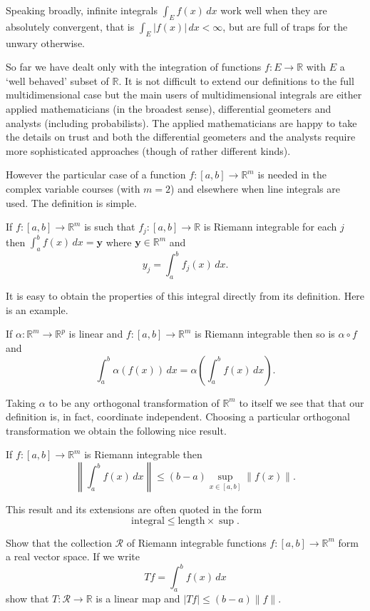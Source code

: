 Speaking broadly, infinite integrals $\int_{E}f(x)\,dx$
work well when they are absolutely convergent, that is
$\int_{E}|f(x)|\,dx<\infty$, but are full of traps for
the unwary otherwise.

So far we have dealt only with the integration
of functions $f:E\rightarrow{\mathbb R}$ with
$E$ a `well behaved' subset of ${\mathbb R}$.
It is not difficult to extend our definitions to
the full multidimensional case but the main users
of multidimensional integrals are either
applied mathematicians (in the broadest sense),
differential geometers and analysts (including probabilists).
The applied mathematicians are happy to take the
details on trust and both the differential geometers
and the analysts require more sophisticated approaches
(though of rather different kinds).

However the particular case of a function
$f:[a,b]\rightarrow{\mathbb R}^{m}$ is needed
in the complex variable courses (with $m=2$)
and elsewhere when line integrals are used.
The definition is simple.
\begin{definition} If $f:[a,b]\rightarrow{\mathbb R}^{m}$
is such that $f_{j}:[a,b]\rightarrow{\mathbb R}$
is Riemann integrable for each $j$ then 
$\int_{a}^{b}f(x)\,dx=\mathbf{y}$ where
${\mathbf y}\in{\mathbb R}^{m}$ and
\[y_{j}=\int_{a}^{b}f_{j}(x)\,dx.\]
\end{definition}
It is easy to obtain the properties of this
integral directly from its definition. Here
is an example.
\begin{lemma} If 
$\alpha:{\mathbb R}^{m}\rightarrow{\mathbb R}^{p}$
is linear and $f:[a,b]\rightarrow{\mathbb R}^{m}$
is Riemann integrable then so is $\alpha\circ f$
and
\[\int_{a}^{b}\alpha(f(x))\,dx=\alpha\left(
\int_{a}^{b}f(x)\,dx\right).\]
\end{lemma}
Taking $\alpha$ to be any orthogonal transformation
of ${\mathbb R}^{m}$ to itself we see that that
our definition is, in fact, coordinate independent.
Choosing a particular orthogonal transformation
we obtain the following nice result.
\begin{theorem} If $f:[a,b]\rightarrow{\mathbb R}^{m}$
is Riemann integrable then
\[\left\|\int_{a}^{b}f(x)\,dx\right\|
\leq (b-a)\sup_{x\in [a,b]}\|f(x)\|.\]
\end{theorem}
This result and its extensions are often quoted in the form
\[\text{integral}\leq\text{length}\times\text{$\sup$}.\] 
\begin{exercise} Show that the collection ${\mathcal R}$ of
Riemann integrable functions 
$f:[a,b]\rightarrow{\mathbb R}^{m}$ form
a real vector space. If we write
\[Tf=\int_{a}^{b}f(x)\,dx\]
show that $T:{\mathcal R}\rightarrow{\mathbb R}$
is a linear map and $|Tf|\leq (b-a)\|f\|$.
\end{exercise}

